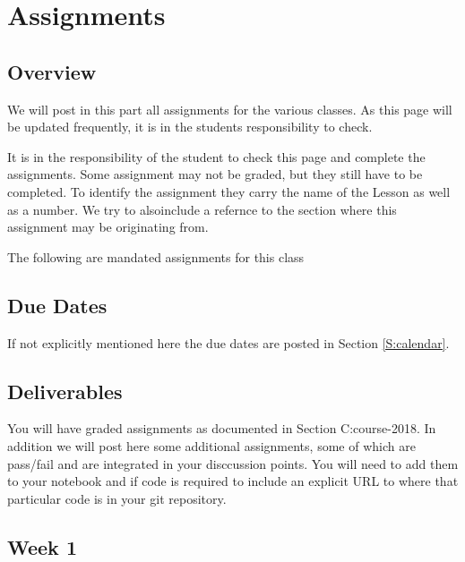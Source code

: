 \chapter{Assignments}

\section{Overview}
\FILENAME

We will post in this part all assignments for the various classes. As
this page will be updated frequently, it is in the students
responsibility to check.

It is in the
responsibility of the student to check this page and complete the
assignments. Some assignment may not be graded, but they still have to
be completed. To identify the assignment they carry the name of the
Lesson as well as a number. We try to alsoinclude a refernce to the
section where this assignment may be originating from.

The following are mandated assignments for this class

\section{Due Dates}

If not explicitly mentioned here the due dates are posted in Section
\ref{S:calendar}.

\section{Deliverables}

You will have graded assignments as documented in Section
{C:course-2018}. In addition we will post here some additional
assignments, some of which are pass/fail and are integrated in your
disccussion points. You will need to add them to your notebook and if
code is required to include an explicit URL to where that particular
code is in your git repository.

\section{Week 1}

